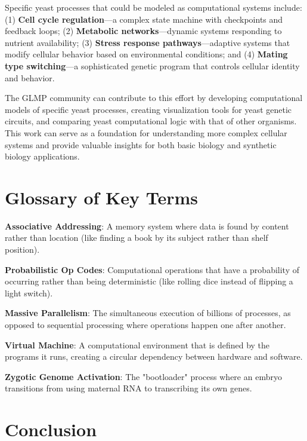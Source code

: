 \documentclass[11pt]{article}
\begin{document}
Specific yeast processes that could be modeled as computational systems include: (1) \textbf{Cell cycle regulation}—a complex state machine with checkpoints and feedback loops; (2) \textbf{Metabolic networks}—dynamic systems responding to nutrient availability; (3) \textbf{Stress response pathways}—adaptive systems that modify cellular behavior based on environmental conditions; and (4) \textbf{Mating type switching}—a sophisticated genetic program that controls cellular identity and behavior.

The GLMP community can contribute to this effort by developing computational models of specific yeast processes, creating visualization tools for yeast genetic circuits, and comparing yeast computational logic with that of other organisms. This work can serve as a foundation for understanding more complex cellular systems and provide valuable insights for both basic biology and synthetic biology applications.

\section{Glossary of Key Terms}

\textbf{Associative Addressing}: A memory system where data is found by content rather than location (like finding a book by its subject rather than shelf position).

\textbf{Probabilistic Op Codes}: Computational operations that have a probability of occurring rather than being deterministic (like rolling dice instead of flipping a light switch).

\textbf{Massive Parallelism}: The simultaneous execution of billions of processes, as opposed to sequential processing where operations happen one after another.

\textbf{Virtual Machine}: A computational environment that is defined by the programs it runs, creating a circular dependency between hardware and software.

\textbf{Zygotic Genome Activation}: The "bootloader" process where an embryo transitions from using maternal RNA to transcribing its own genes.

\section{Conclusion}
\end{document}
